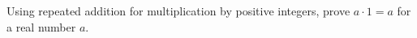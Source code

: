 Using repeated addition for multiplication by positive integers, prove $a\cdot1=a$ for a real number $a$.
